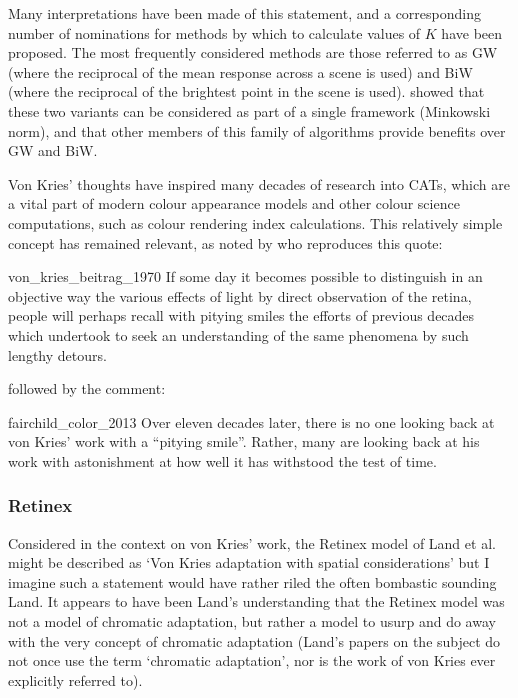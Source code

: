 Many interpretations have been made of this statement, and a corresponding number of nominations for methods by which to calculate values of $K$ have been proposed. The most frequently considered methods are those referred to as \acrfull{GW} (where the reciprocal of the mean response across a scene is used) and \acrfull{BiW} (where the reciprocal of the brightest point in the scene is used). \citet{finlayson_shades_2004} showed that these two variants can be considered as part of a single framework (Minkowski norm), and that other members of this family of algorithms provide benefits over \gls{GW} and \gls{BiW}.

Von Kries' thoughts have inspired many decades of research into \glspl{CAT}, which are a vital part of modern colour appearance models and other colour science computations, such as colour rendering index calculations. This relatively simple concept has remained relevant, as noted by \citet[p. 182]{fairchild_color_2013} who reproduces this quote:

\begin{citequote}{von_kries_beitrag_1970}
If some day it becomes possible to distinguish in an objective way the
various effects of light by direct observation of the retina, people will perhaps
recall with pitying smiles the efforts of previous decades which
undertook to seek an understanding of the same phenomena by such
lengthy detours.
\end{citequote}

followed by the comment:

\begin{citequote}{fairchild_color_2013}
Over eleven decades later, there is no one looking back at von Kries' work
with a ``pitying smile''. Rather, many are looking back at his work with
astonishment at how well it has withstood the test of time.
\end{citequote}

\subsubsection{Retinex}

Considered in the context on von Kries' work, the Retinex model of Land et al. \citep{land_retinex_1964,land_lightness_1971,land_recent_1983,land_recent_1986,mccann_quantitative_1976} might be described as `Von Kries adaptation with spatial considerations' but I imagine such a statement would have rather riled the often bombastic sounding Land. It appears to have been Land's understanding that the Retinex model was not a model of chromatic adaptation, but rather a model to usurp and do away with the very concept of chromatic adaptation (Land's papers on the subject \citep{land_retinex_1964,land_lightness_1971,land_recent_1983,land_recent_1986} do not once use the term `chromatic adaptation', nor is the work of von Kries ever explicitly referred to). 

